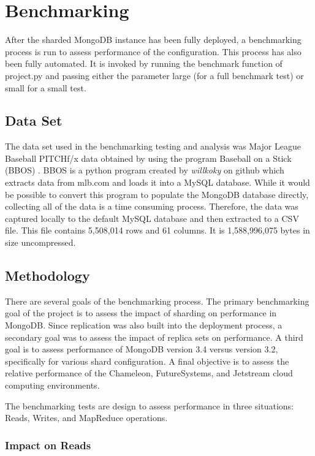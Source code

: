 \documentclass[9pt,twocolumn,twoside]{../../styles/osajnl}
\begin{document}
\section{Benchmarking}

After the sharded MongoDB instance has been fully deployed, a
benchmarking process is run to assess performance of the
configuration. This process has also been fully automated. It is
invoked by running the benchmark function of project.py and passing
either the parameter large (for a full benchmark test) or small for a
small test.

\subsection{Data Set}

The data set used in the benchmarking testing and analysis was Major
League Baseball PITCHf/x data obtained by using the program Baseball
on a Stick (BBOS) \cite{www-bbos}. BBOS is a python program created by
\emph{willkoky} on github which extracts data from mlb.com and loads
it into a MySQL database. While it would be possible to convert this
program to populate the MongoDB database directly, collecting all of
the data is a time consuming process. Therefore, the data was captured
locally to the default MySQL database and then extracted to a CSV
file. This file contains 5,508,014 rows and 61 columns. It is
1,588,996,075 bytes in size uncompressed.


\subsection{Methodology}

There are several goals of the benchmarking process. The primary
benchmarking goal of the project is to assess the impact of sharding
on performance in MongoDB. Since replication was also built into the
deployment process, a secondary goal was to assess the impact of
replica sets on performance. A third goal is to assess performance of
MongoDB version 3.4 versus version 3.2, specifically for various shard
configuration. A final objective is to assess the relative performance
of the Chameleon, FutureSystems, and Jetstream cloud computing
environments.

The benchmarking tests are design to assess performance in three
situations: Reads, Writes, and MapReduce operations.



\subsubsection{Impact on Reads}
\end{document}
